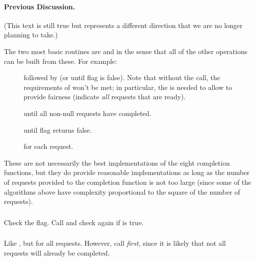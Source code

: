 \documentclass{article}
\begin{document}
\paragraph{Previous Discussion.}
(This text is still true but represents a different direction that we
are no longer planning to take.)

The two most basic routines are  and
 in the sense that all of the other operations
can be built from these.  For example:
\begin{description}
\item[]
\item[] followed by
 (or  until flag is false).
Note that without the  
call, the requirements of  won't be met; in
particular, the  is needed to allow
 to provide fairness (indicate \emph{all}
requests that are ready).
\item[] until all non-null
requests have completed.
\item[]
\item[] until flag returns
false.
\item[] for each request.
\end{description}
These are not necessarily the best implementations of the eight
completion functions, but they do provide reasonable implementations
as long as the number of requests provided to the completion function
is not too large (since some of the algorithms above have complexity
proportional to the square of the number of requests).


\subsubsection{}
Check the  flag.  Call
 and check again if
 is true.

\subsubsection{}
Like , but for all requests.  However, call
 \emph{first}, since it is likely that
not all requests will already be completed.
\end{document}
